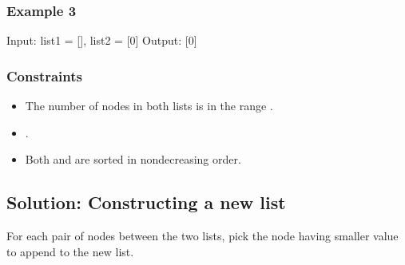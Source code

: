 \documentclass[letterpaper,12pt,english]{book}
\begin{document}
\subsubsection{Example 3}
\label{\detokenize{Linked_List/02_LL_21_Merge_Two_Sorted_Lists:example-3}}
\begin{sphinxVerbatim}[commandchars=\\\{\}]
Input: list1 = [], list2 = [0]
Output: [0]
\end{sphinxVerbatim}


\subsubsection{Constraints}
\label{\detokenize{Linked_List/02_LL_21_Merge_Two_Sorted_Lists:constraints}}\begin{itemize}
\item {} 
\sphinxAtStartPar
The number of nodes in both lists is in the range \sphinxcode{\sphinxupquote{{[}0, 50{]}}}.

\item {} 
\sphinxAtStartPar
{}.

\item {} 
\sphinxAtStartPar
Both  and  are sorted in non\sphinxhyphen{}decreasing order.

\end{itemize}


\subsection{Solution: Constructing a new list}
\label{\detokenize{Linked_List/02_LL_21_Merge_Two_Sorted_Lists:solution-constructing-a-new-list}}
\sphinxAtStartPar
For each pair of nodes between the two lists, pick the node having smaller value to append to the new list.
\end{document}
